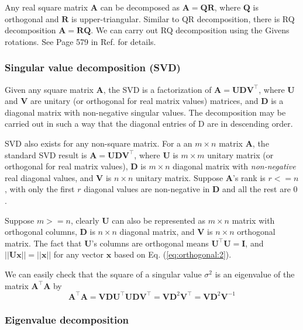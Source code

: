 \documentclass[12pt]{article}
\numberwithin{equation}{section}
\begin{document}
Any real square matrix $\mathbf{A}$ can be decomposed as $\mathbf{A} = \mathbf{QR}$, where $\mathbf{Q}$ is orthogonal and $\mathbf{R}$ is upper-triangular. Similar to QR decomposition, there is RQ decomposition $\mathbf{A} = \mathbf{RQ}$. We can carry out RQ decomposition using the Givens rotations. See Page 579 in Ref. \citep{hartley2003multiple} for details.

\subsubsection{Singular value decomposition (SVD)}

Given any square matrix $\mathbf{A}$, the SVD is a factorization of $\mathbf{A = UDV}^{\top}$, where $\mathbf{U}$ and $\mathbf{V}$ are unitary (or orthogonal for real matrix values) matrices, and $\mathbf{D}$ is a diagonal matrix with non-negative singular values. The decomposition
may be carried out in such a way that the diagonal entries of D are in descending order.

SVD also exists for any non-square matrix. For a an $m \times n$ matrix $\mathbf{A}$, the standard SVD result is $\mathbf{A = UDV}^{\top}$, where $\mathbf{U}$ is $m \times m$ unitary matrix (or orthogonal for real matrix values), $\mathbf{D}$ is $m \times n$ diagonal matrix with \textit{non-negative} real diagonal values, and $\mathbf{V}$ is $n \times n$ unitary matrix. Suppose $\mathbf{A}$'s rank is $r <= n$, with only the first $r$ diagonal values are non-negative in $\mathbf{D}$ and all the rest are $0$.

Suppose $m >= n$, clearly $\mathbf{U}$ can also be represented as $m \times n$ matrix with orthogonal columns, $\mathbf{D}$ is $n \times n$ diagonal matrix, and $\mathbf{V}$ is $n \times n$ orthogonal matrix. The fact that $\mathbf{U}$'s columns are orthogonal means $\mathbf{U}^\top\mathbf{U} = \mathbf{I}$, and $||\mathbf{Ux}|| = ||\mathbf{x}||$ for any vector $\mathbf{x}$ based on Eq. (\ref{eq:orthogonal:2}).

We can easily check that the square of a singular value $\sigma^2$ is an eigenvalue of the matrix $\mathbf{A^\top A}$ by
\begin{equation*}
\mathbf{A^\top A} = \mathbf{VDU^\top UDV^\top} = \mathbf{VD}^2\mathbf{V}^\top = \mathbf{VD}^2\mathbf{V}^{-1}
\end{equation*}

\subsubsection{Eigenvalue decomposition}
\label{sec:eigen_decomp}
\end{document}
